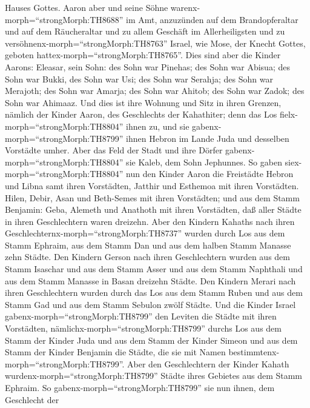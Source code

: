 Hauses Gottes.  Aaron aber und seine Söhne
warenx-morph=``strongMorph:TH8688'' im Amt, anzuzünden auf dem
Brandopferaltar und auf dem Räucheraltar und zu allem Geschäft im
Allerheiligsten und zu versöhnenx-morph=``strongMorph:TH8763'' Israel,
wie Mose, der Knecht Gottes, geboten
hattex-morph=``strongMorph:TH8765''.  Dies sind aber die
Kinder Aarons: Eleasar, sein Sohn: des Sohn war Pinehas; des Sohn war
Abisua;  des Sohn war Bukki, des Sohn war Usi; des Sohn war
Serahja;  des Sohn war Merajoth; des Sohn war Amarja; des
Sohn war Ahitob;  des Sohn war Zadok; des Sohn war Ahimaaz.
 Und dies ist ihre Wohnung und Sitz in ihren Grenzen,
nämlich der Kinder Aaron, des Geschlechts der Kahathiter; denn das Los
fielx-morph=``strongMorph:TH8804'' ihnen zu,  und sie
gabenx-morph=``strongMorph:TH8799'' ihnen Hebron im Lande Juda und
desselben Vorstädte umher.  Aber das Feld der Stadt und
ihre Dörfer gabenx-morph=``strongMorph:TH8804'' sie Kaleb, dem Sohn
Jephunnes.  So gaben siex-morph=``strongMorph:TH8804'' nun
den Kinder Aaron die Freistädte Hebron und Libna samt ihren Vorstädten,
Jatthir und Esthemoa mit ihren Vorstädten.  Hilen, Debir,
 Asan und Beth-Semes mit ihren Vorstädten; 
und aus dem Stamm Benjamin: Geba, Alemeth und Anathoth mit ihren
Vorstädten, daß aller Städte in ihren Geschlechtern waren dreizehn.
 Aber den Kindern Kahaths nach ihren
Geschlechternx-morph=``strongMorph:TH8737'' wurden durch Los aus dem
Stamm Ephraim, aus dem Stamm Dan und aus dem halben Stamm Manasse zehn
Städte.  Den Kindern Gerson nach ihren Geschlechtern wurden
aus dem Stamm Isaschar und aus dem Stamm Asser und aus dem Stamm
Naphthali und aus dem Stamm Manasse in Basan dreizehn Städte.
 Den Kindern Merari nach ihren Geschlechtern wurden durch
das Los aus dem Stamm Ruben und aus dem Stamm Gad und aus dem Stamm
Sebulon zwölf Städte.  Und die Kinder Israel
gabenx-morph=``strongMorph:TH8799'' den Leviten die Städte mit ihren
Vorstädten,  nämlichx-morph=``strongMorph:TH8799'' durchs
Los aus dem Stamm der Kinder Juda und aus dem Stamm der Kinder Simeon
und aus dem Stamm der Kinder Benjamin die Städte, die sie mit Namen
bestimmtenx-morph=``strongMorph:TH8799''.  Aber den
Geschlechtern der Kinder Kahath wurdenx-morph=``strongMorph:TH8799''
Städte ihres Gebietes aus dem Stamm Ephraim.  So
gabenx-morph=``strongMorph:TH8799'' sie nun ihnen, dem Geschlecht der
